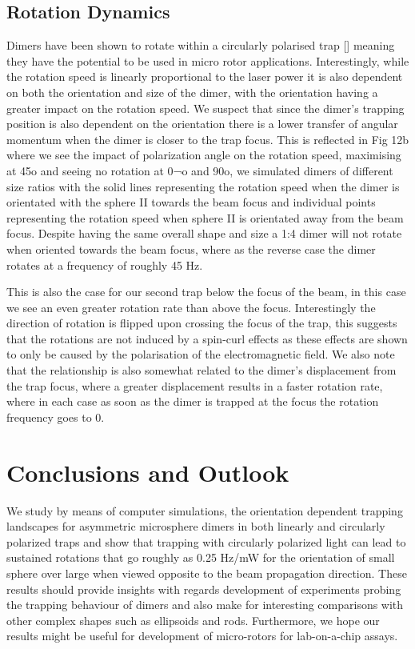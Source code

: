 \documentclass[preprint,  3p]{elsarticle}
\begin{document}
\subsection{Rotation Dynamics}
Dimers have been shown to rotate within a circularly polarised trap [] meaning they have the potential to be used in micro rotor applications. Interestingly, while the rotation speed is linearly proportional to the laser power it is also dependent on both the orientation and size of the dimer, with the orientation having a greater impact on the rotation speed. We suspect that since the dimer’s trapping position is also dependent on the orientation there is a lower transfer of angular momentum when the dimer is closer to the trap focus. This is reflected in Fig 12b where we see the impact of polarization angle on the rotation speed, maximising at 45o and seeing no rotation at 0¬o and 90o, we simulated dimers of different size ratios with the solid lines representing the rotation speed when the dimer is orientated with the sphere II towards the beam focus and individual points representing the rotation speed when sphere II is orientated away from the beam focus. Despite having the same overall shape and size a 1:4 dimer will not rotate when oriented towards the beam focus, where as the reverse case the dimer rotates at a frequency of roughly 45 Hz. 

This is also the case for our second trap below the focus of the beam, in this case we see an even greater rotation rate than above the focus. Interestingly the direction of rotation is flipped upon crossing the focus of the trap, this suggests that the rotations are not induced by a spin-curl effects as these effects are shown to only be caused by the polarisation of the electromagnetic field. We also note that the relationship is also somewhat related to the dimer’s displacement from the trap focus, where a greater displacement results in a faster rotation rate, where in each case as soon as the dimer is trapped at the focus the rotation frequency goes to 0.

\section{Conclusions and Outlook}
	
	We study by means of computer simulations, the orientation dependent trapping landscapes for asymmetric microsphere dimers in both linearly and circularly polarized traps and show that trapping with circularly polarized light can lead to sustained rotations that go roughly as 0.25 Hz/mW for the orientation of small sphere over large when viewed opposite to the beam propagation direction. These results should provide insights with regards development of experiments probing the trapping behaviour of dimers and also make for interesting comparisons with other complex shapes such as ellipsoids and rods. Furthermore, we hope our results might be useful for development of micro-rotors for lab-on-a-chip assays. 
	
\newpage
 

\end{document}
